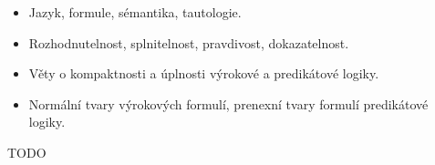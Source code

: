 \begin{itemize}
\item Jazyk, formule, sémantika, tautologie.
\item Rozhodnutelnost, splnitelnost, pravdivost, dokazatelnost.
\item Věty o kompaktnosti a úplnosti výrokové a predikátové logiky.
\item Normální tvary výrokových formulí, prenexní tvary formulí predikátové logiky.
\end{itemize}

TODO
